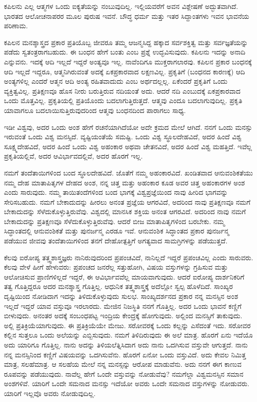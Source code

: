 ಕಪಿಲನು ಎಲ್ಲ ಆತ್ಮಗಳ ಒಂದು ಐಕ್ಯತೆಯನ್ನು ನಂಬುವುದಿಲ್ಲ. ಇಲ್ಲಿಯವರೆಗೆ ಅವನ ವಿಶ್ಲೇಷಣೆ ಅದ್ಭುತವಾಗಿದೆ. ಭಾರತದ ಆಲೋಚನಾಪರರ ಮೂಲ ಪುರುಷ ಇವನೆ. ಬೌದ್ಧ ಧರ್ಮ ಮತ್ತು ಇತರ ಸಿದ್ದಾಂತಗಳು ಇವನ ಭಾವನೆಯ ಪರಿಣಾಮ.

ಕಪಿಲನ ಮನಶ್ಶಾಸ್ತ್ರದ ಪ್ರಕಾರ ಪ್ರತಿಯೊಬ್ಬ ಜೀವರೂ ತಮ್ಮ ಆಜನ್ಮಸಿದ್ದ ಹಕ್ಕಾದ ಸರ್ವಶಕ್ತಿತ್ವ ಮತ್ತು ಸರ್ವಜ್ಞತೆಯನ್ನು ಪಡೆದು ಸ್ವತಂತ್ರರಾಗಬಹುದು. ಈ ಬಂಧನ ಹೇಗೆ ಬಂತು ಎಂಬ ಪ್ರಶ್ನೆ ಉದ್ಭವಿಸುವುದು. ಕಪಿಲನು ಇದನ್ನು ಅನಾದಿ ಎನ್ನುವನು. ಇದಕ್ಕೆ ಆದಿ ಇಲ್ಲದೆ ಇದ್ದರೆ ಅಂತ್ಯವೂ ಇಲ್ಲ. ನಾವೆಂದಿಗೂ ಮುಕ್ತರಾಗಲಾರವು. ಕಪಿಲನ ಪ್ರಕಾರ ಬಂಧನಕ್ಕೆ ಆದಿ ಇಲ್ಲದೆ ಇದ್ದರೂ, ಆತ್ಮನಿಗಿರುವಂತೆ ಅದಕ್ಕೆ ಏಕಪ್ರಕಾರವಾದ ಲಕ್ಷಣವಿಲ್ಲ. ಪ್ರಕೃತಿಗೆ (ಬಂಧನದ ಕಾರಣಕ್ಕೆ) ಆದಿ ಅಂತ್ಯಗಳಿಲ್ಲ ಎಂದರೆ ಆತ್ಮನ ಆದಿ ಅಂತ್ಯ ರಹಿತವಾದುದು ಎಂಬ ಅರ್ಥದಲ್ಲಲ್ಲ. ಏಕೆಂದರೆ ಪ್ರಕೃತಿಗೆ ಒಂದು ವ್ಯಕ್ತಿತ್ವವಿಲ್ಲ. ಪ್ರತಿಕ್ಷಣವೂ ಹೊಸ ನೀರು ಬರುತ್ತಿರುವ ನದಿಯಂತೆ ಅದು. ಆದರೆ ನದಿ ಎಂಬುದಕ್ಕೆ ಏಕಪ್ರಕಾರವಾದ ಒಂದು ಮೊತ್ತವಿಲ್ಲ. ಪ್ರಕೃತಿಯಲ್ಲಿ ಪ್ರತಿಯೊಂದು ಬದಲಾಗುತ್ತಿರುತ್ತದೆ. ಆತ್ಮವು ಎಂದೂ ಬದಲಾಗುವುದಿಲ್ಲ. ಪ್ರಕೃತಿ ಯಾವಾಗಲೂ ಬದಲಾಯಿಸುತ್ತಿರುವುದರಿಂದ ಆತ್ಮವು ಬಂಧನದಿಂದ ಪಾರಾಗಲು ಸಾಧ್ಯ.

ಇಡೀ ವಿಶ್ವವು, ಅದರ ಒಂದು ಅಂಶ ಹೇಗೆ ರಚನೆಯಾಗಿದೆಯೋ ಅದೇ ಕ್ರಮದ ಮೇಲೆ ಆಗಿದೆ. ನನಗೆ ಒಂದು ಮನಸ್ಸು ಇರುವಂತೆ ಒಂದು ವಿಶ್ವ ಮನಸ್ಸಿದೆ. ವ್ಯಷ್ಟಿಯಂತೆಯೆ ಸಮಷ್ಟಿ. ಒಂದು ವಿಶ್ವ ಸ್ಥೂಲದೇಹವಿದೆ, ಅದರ ಹಿಂದೆ ವಿಶ್ವ ಸೂಕ್ಷ್ಮದೇಹವಿದೆ, ಅದರ ಹಿಂದೆ ಒಂದು ವಿಶ್ವ ಅಹಂಕಾರ ಅಥವಾ ಚೇತನವಿದೆ, ಅದರ ಹಿಂದೆ ವಿಶ್ವ ಮಹತ್ತಿದೆ. ಇವೆಲ್ಲ ಪ್ರಕೃತಿಯಲ್ಲಿವೆ, ಅದರ ಆವಿರ್ಭಾವದಲ್ಲಿವೆ, ಅದರ ಹೊರಗೆ ಇಲ್ಲ.

ನಮಗೆ ತಂದೆತಾಯಿಗಳಿಂದ ಬಂದ ಸ್ಥೂಲದೇಹವಿದೆ. ಜೊತೆಗೆ ನಮ್ಮ ಅಹಂಕಾರವಿದೆ. ಖಂಡಿತವಾದ ಆನುವಂಶಿಕತೆಯು ನಮ್ಮ ದೇಹ ಮಾತಾಪಿತೃಗಳ ದೇಹದ ಅಂಶ, ನನ್ನ ಚಿತ್ತ ಮತ್ತು ಅಹಂಕಾರ ಕೂಡ ಅವರ ಚಿತ್ತ ಅಹಂಕಾರಗಳ ಅಂಶ ಎಂದು ಸಾರುವುದು. ನಮ್ಮ ತಾಯಿತಂದೆಗಳಿಂದ ಬಂದ ಭಾಗಕ್ಕೆ ವಿಶ್ವಪ್ರಜ್ಞೆಯಿಂದ ನಾವು ಹೀರಿದ ಭಾಗವನ್ನು ಸೇರಿಸಬಹುದು. ನಮಗೆ ಬೇಕಾದುದನ್ನು ಹೀರಲು ಅನಂತ ಪ್ರಜ್ಞೆಯ ಆಗರವಿದೆ, ಅದರಿಂದ ನಾವು ಪ್ರತಿಕ್ಷಣವೂ ನಮಗೆ ಬೇಕಾದುದನ್ನು ಸೆಳೆದುಕೊಳ್ಳುತ್ತಿರುವೆವು. ವಿಶ್ವದಲ್ಲಿ ಮಾನಸಿಕ ಶಕ್ತಿಯ ಅನಂತ ಆಗರವಿದೆ. ಅದರಿಂದ ನಾವು ನಮಗೆ ಬೇಕಾದುದನ್ನು ಪ್ರತಿಕ್ಷಣವೂ ಸೆಳೆದುಕೊಳ್ಳುತ್ತಿರುವೆವು. ಆದರೆ ಬೀಜ ಮಾತಾಪಿತೃಗಳಿಂದ ಬರಬೇಕು. ನಮ್ಮ ಸಿದ್ಧಾಂತದಲ್ಲಿ ಆನುವಂಶಿಕತೆ ಮತ್ತು ಪುನರ್ಜನ್ಮ ಎರಡೂ ಇವೆ. ಆನುವಂಶಿಕ ಸಿದ್ಧಾಂತದ ಪ್ರಕಾರ ಪುನರ್ಜನ್ಮ ಪಡೆಯುವ ಜೀವವು ತಂದೆತಾಯಿಗಳಿಂದ ತನಗೆ ದೇಹೋತ್ಪತ್ತಿಗೆ ಅಗತ್ಯವಾದ ಸಾಮಗ್ರಿಗಳನ್ನು ಪಡೆಯುತ್ತದೆ.

ಕೆಲವು ಐರೋಪ್ಯ ತತ್ತ್ವಶಾಸ್ತ್ರಜ್ಞರು ನಾನಿರುವುದರಿಂದ ಪ್ರಪಂಚವಿದೆ, ನಾನಿಲ್ಲದೆ ಇದ್ದರೆ ಪ್ರಪಂಚವಿಲ್ಲ ಎಂದು ಸಾರುವರು. ಕೆಲವು ವೇಳೆ ಹೀಗೆ ಹೇಳುವರು: ಪ್ರಪಂಚದ ಜನರೆಲ್ಲ ಸತ್ತುಹೋಗಿ, ವಿಷಯ ವಸ್ತುಗಳನ್ನು ಗ್ರಹಿಸುವ ಮತ್ತು ಆಲೋಚಿಸುವ ಪ್ರಾಣಿಗಳಿಲ್ಲದೆ ಇದ್ದರೆ, ಈ ಆವಿರ್ಭಾವವೆಲ್ಲ ಮಾಯವಾಗುವುದು. ಆದರೆ ಐರೋಪ್ಯ ದಾರ್ಶನಿಕರಿಗೆ ತತ್ವ ಗೊತ್ತಿದ್ದರೂ ಅದರ ಮನಶ್ಶಾಸ್ತ್ರ ಗೊತ್ತಿಲ್ಲ. ಆಧುನಿಕ ತತ್ತ್ವಶಾಸ್ತ್ರಕ್ಕೆ ಅದೆಲ್ಲೋ ಸ್ವಲ್ಪ ಹೊಳೆದಿದೆ. ಸಾಂಖ್ಯರ ದೃಷ್ಟಿಯಿಂದ ನೋಡಿದಾಗ ಇದನ್ನು ತಿಳಿದುಕೊಳ್ಳುವುದು ಸುಲಭ. ಸಾಂಖ್ಯದರ್ಶನದ ಪ್ರಕಾರ ನನ್ನ ಮನಸ್ಸಿನ ಅಂಶ ಇಲ್ಲದೆ ಇದ್ದರೆ ಯಾವ ವಸ್ತುವೂ ಇರಲಾರದು. ಮೇಜಿನ ನಿಜಸ್ಥಿತಿ ನನಗೆ ಗೊತ್ತಿಲ್ಲ. ಅದರ ಒಂದು ಭಾವನೆ ಕಣ್ಣಿಗೆ ಬೀಳುವುದು. ಅನಂತರ ಅದಕ್ಕೆ ಸಂಬಂಧಪಟ್ಟ ಇಂದ್ರಿಯ ಕೇಂದ್ರಕ್ಕೆ ಹೋಗುವುದು. ಅಲ್ಲಿಂದ ಮನಸ್ಸಿಗೆ ತಾಕುವುದು. ಅಲ್ಲಿ ಪ್ರತಿಕ್ರಿಯೆಯಾಗುವುದು. ಈ ಪ್ರತಿಕ್ರಿಯೆಯೇ ಮೇಜು. ಸರೋವರಕ್ಕೆ ಒಂದು ಕಲ್ಲನ್ನು ಎಸೆದಂತೆ ಇದು. ಸರೋವರ ಕಲ್ಲಿನ ಸುತ್ತಲೂ ಒಂದು ಅಲೆಯನ್ನು ಎಬ್ಬಿಸುವುದು. ನಮಗೆ ತಿಳಿದಿರುವುದು ಈ ಅಲೆ ಮಾತ್ರ. ಹೊರಗೆ ಏನು ಇದೆಯೊ ಅದು ಯಾರಿಗೂ ಗೊತ್ತಿಲ್ಲ. ನಾನು ಅದನ್ನು ತಿಳಿಯಲೆತ್ನಿಸಿದಾಗ ಅದು ನಾನು ಒದಗಿಸುವ ವಸ್ತುವೇ ಆಗುತ್ತದೆ. ನಾನು ನನ್ನ ಮನಸ್ಸಿನಿಂದ ಕಣ್ಣಿಗೆ ವಿಷಯವನ್ನು ಒದಗಿಸುವೆನು. ಹೊರಗೆ ಏನೋ ಒಂದು ವಸ್ತುವಿದೆ. ಅದು ಕೇವಲ ನಿಮಿತ್ತ ಮಾತ್ರ, ಸಲಹೆಮಾತ್ರ. ಆ ಸಲಹೆಯ ಮೇಲೆ ನನ್ನ ಮನಸ್ಸನ್ನು ಆರೋಪ ಮಾಡುವೆನು. ಅದು ನನಗೆ ಈಗ ಕಾಣುವ ರೂಪವನ್ನು ಪಡೆಯುವುದು. ನಾವೆಲ್ಲ ಹೇಗೆ ಒಂದೇ ವಸ್ತುವನ್ನು ನೋಡುವೆವು? ನಮಗೆಲ್ಲಾ ವಿಶ್ವಮನಸ್ಸಿನ ಸಮಾನ ಅಂಶಗಳಿವೆ. ಯಾರಿಗೆ ಒಂದೇ ಸಮನಾದ ಮನಸ್ಸು ಇದೆಯೋ ಅವರು ಒಂದೇ ಸಮನಾದ ವಸ್ತುಗಳನ್ನು ನೋಡುವರು. ಯಾರಿಗೆ ಇಲ್ಲವೊ ಅವರು ನೋಡುವುದಿಲ್ಲ.

